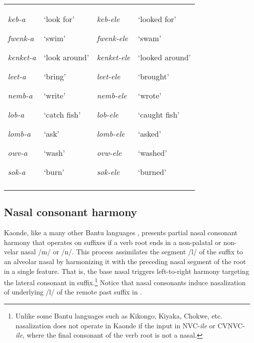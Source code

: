 \documentclass[output=paper]{langsci/langscibook}
\begin{document}
\begin{tabularx}{\textwidth}{XXXX}
\lsptoprule
{\emph{keb-a}}

{\emph{fwenk-a}}

{\emph{kenket-a}}

{\emph{leet-a}}

{\emph{nemb-a}}

{\emph{lob-a}}

{\emph{lomb-a}}

{\emph{owv-a}}

\emph{sok-a} & {‘look for’}

{‘swim’}

{‘look around’}

{‘bring’}

{‘write’}

{‘catch fish’}

{‘ask’}

{‘wash’}

‘burn’ & {\emph{keb-ele}}

{\emph{fwenk-ele}}

{\emph{kenket-ele}}

{\emph{leet-ele}}

{\emph{nemb-ele}}

{\emph{lob-ele}}

{\emph{lomb-ele}}

{\emph{ovw-ele}}

\emph{sok-ele} & {‘looked for’}

{‘swam’}

{‘looked around’}

{‘brought’}

{‘wrote’}

{‘caught fish’}

{‘asked’}

{‘washed’}

‘burned’\\
\lspbottomrule
\end{tabularx}
\subsection{Nasal consonant harmony }


Kaonde, like a many other Bantu languages \citep{Greenberg1951}, presents partial nasal consonant harmony that operates on suffixes if a verb root ends in a non-palatal or non-velar nasal /m/ or /n/. This process assimilates the segment /l/ of the suffix to an alveolar nasal by harmonizing it with the preceding nasal segment of the root in a single feature. That is, the base nasal triggers left-to-right harmony targeting the lateral consonant in suffix.\footnote{ Unlike some Bantu languages such as Kikongo, Kiyaka, Chokwe, etc. nasalization does not operate in Kaonde if the input in NVC-\textit{ile} or CVNVC-\textit{ile}, where the final consonant of the verb root is not a nasal.  } Notice that nasal consonants induce nasalization of underlying /l/ of the remote past suffix in . 
\end{document}
